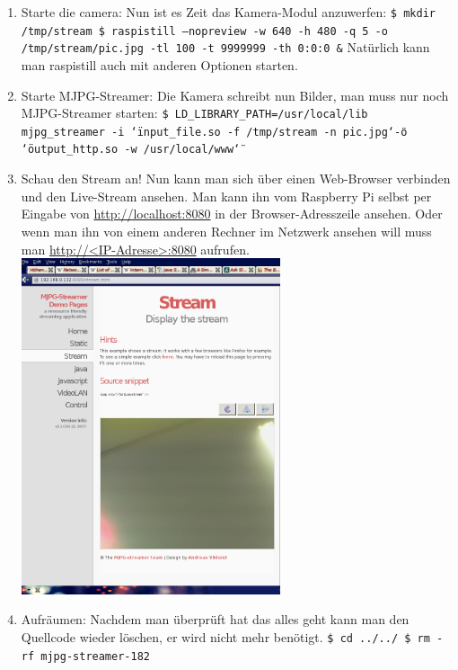 \documentclass[12pt,a4paper,titlepage]{scrartcl} %
\begin{document}
\begin{enumerate}
\item Starte die camera:\newline
\textnormal{Nun ist es Zeit das Kamera-Modul anzuwerfen:}\newline
\texttt{\$ mkdir /tmp/stream\newline
\$ raspistill --nopreview -w 640 -h 480 -q 5 -o /tmp/stream/pic.jpg -tl 100 -t 9999999 -th 0:0:0 \&}\newline
\textnormal{Natürlich kann man raspistill auch mit anderen Optionen starten.}

\item Starte MJPG-Streamer:\newline
\textnormal{Die Kamera schreibt nun Bilder, man muss nur noch MJPG-Streamer starten:}\newline
\texttt{\$ LD\_LIBRARY\_PATH=/usr/local/lib mjpg\_streamer -i \char`\"input\_file.so -f /tmp/stream -n pic.jpg\char`\" -o \char`\"output\_http.so -w /usr/local/www\char`\"} %

\item Schau den Stream an!\newline
\textnormal{Nun kann man sich über einen Web-Browser verbinden und den Live-Stream ansehen. Man kann ihn vom Raspberry Pi selbst per Eingabe von \url{http://localhost:8080} in der Browser-Adresszeile ansehen. Oder wenn man ihn von einem anderen Rechner im Netzwerk ansehen will muss man \url{http://<IP-Adresse>:8080} aufrufen.}\newline
	    \includegraphics[width=0.6\textwidth]{Streaming/MJPG-Streamer_cut}

\item Aufräumen:\newline
\textnormal{Nachdem man überprüft hat das alles geht kann man den Quellcode wieder löschen, er wird nicht mehr benötigt.}\newline
\texttt{\$ cd ../../\newline
\$ rm -rf mjpg-streamer-182}
\end{enumerate}
\end{document}
